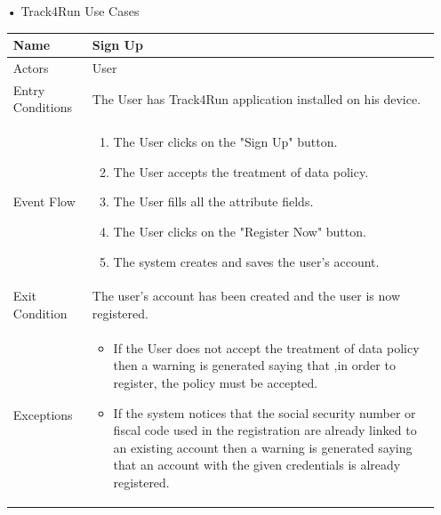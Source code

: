 \begin{enumerate}
\FloatBarrier
\item[•]{\Large Track4Run Use Cases}
\begin{table}[h]
\begin{tabular}{|l|p{}|}
\hline
Name             & Sign Up \\ \hline
Actors           & User  \\ \hline
Entry Conditions & The User has Track4Run application installed on his device.    \\ \hline
Event Flow       & \begin{enumerate}
            \item The User clicks on the "Sign Up" button.
            \item The User accepts the treatment of data policy.
            \item The User fills all the attribute fields.
            \item The User clicks on the "Register Now" button.
            \item The system creates and saves the user's account.
        \end{enumerate}\\ \hline
Exit Condition   & The user's account has been created and the user is now registered.\\ \hline
Exceptions       & \begin{itemize}
\item If the User does not accept the treatment of data policy then a warning is generated saying that ,in order to register, the policy must be accepted.
\item If the system notices that the social security number or fiscal code used in the registration are already linked to an existing account then a warning is generated saying that an account with the given credentials is already registered.
\end{itemize}\\ \hline
\end{tabular}
\end{table}
\FloatBarrier


\end{enumerate}
